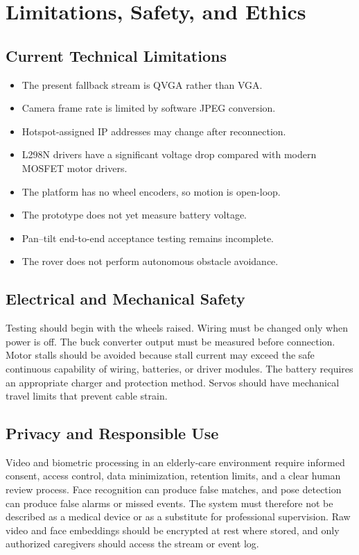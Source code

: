 \documentclass[12pt,a4paper,oneside]{report}
\begin{document}
\chapter{Limitations, Safety, and Ethics}
\label{ch:limitations}

\section{Current Technical Limitations}
\begin{itemize}
  \item The present fallback stream is QVGA rather than VGA.
  \item Camera frame rate is limited by software JPEG conversion.
  \item Hotspot-assigned IP addresses may change after reconnection.
  \item L298N drivers have a significant voltage drop compared with modern
        MOSFET motor drivers.
  \item The platform has no wheel encoders, so motion is open-loop.
  \item The prototype does not yet measure battery voltage.
  \item Pan--tilt end-to-end acceptance testing remains incomplete.
  \item The rover does not perform autonomous obstacle avoidance.
\end{itemize}

\section{Electrical and Mechanical Safety}
Testing should begin with the wheels raised. Wiring must be changed only when
power is off. The buck converter output must be measured before connection.
Motor stalls should be avoided because stall current may exceed the safe
continuous capability of wiring, batteries, or driver modules. The battery
requires an appropriate charger and protection method. Servos should have
mechanical travel limits that prevent cable strain.

\section{Privacy and Responsible Use}
Video and biometric processing in an elderly-care environment require informed
consent, access control, data minimization, retention limits, and a clear human
review process. Face recognition can produce false matches, and pose detection
can produce false alarms or missed events. The system must therefore not be
described as a medical device or as a substitute for professional supervision.
Raw video and face embeddings should be encrypted at rest where stored, and
only authorized caregivers should access the stream or event log.
\end{document}
